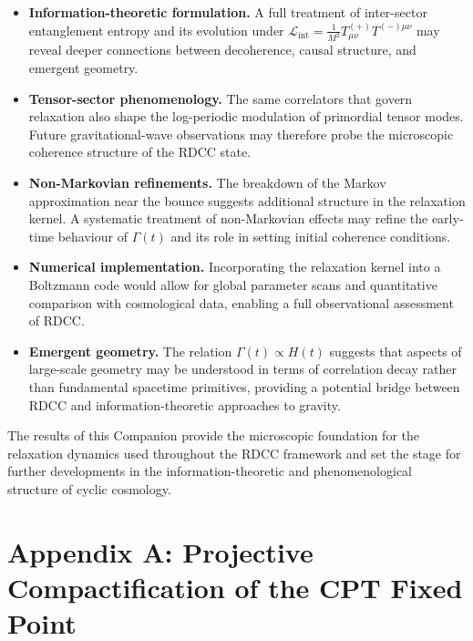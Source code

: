 \documentclass[11pt,a4paper]{article}
\newcommand{\LintDef}{\mathcal{L}_{\mathrm{int}} = \frac{1}{M^2} T^{(+)}_{\mu\nu} T^{(-)\mu\nu}}
\begin{document}
\begin{itemize}
    \item \textbf{Information-theoretic formulation.}
          A full treatment of inter-sector entanglement entropy and its
          evolution under \(\LintDef\) may reveal deeper connections between
          decoherence, causal structure, and emergent geometry.

    \item \textbf{Tensor-sector phenomenology.}
          The same correlators that govern relaxation also shape the
          log-periodic modulation of primordial tensor modes. Future
          gravitational-wave observations may therefore probe the microscopic
          coherence structure of the RDCC state.

    \item \textbf{Non-Markovian refinements.}
          The breakdown of the Markov approximation near the bounce suggests
          additional structure in the relaxation kernel. A systematic treatment
          of non-Markovian effects may refine the early-time behaviour of
          \(\Gamma(t)\) and its role in setting initial coherence conditions.

    \item \textbf{Numerical implementation.}
          Incorporating the relaxation kernel into a Boltzmann code would allow
          for global parameter scans and quantitative comparison with
          cosmological data, enabling a full observational assessment of RDCC.

    \item \textbf{Emergent geometry.}
          The relation \(\Gamma(t) \propto H(t)\) suggests that aspects of
          large-scale geometry may be understood in terms of correlation decay
          rather than fundamental spacetime primitives, providing a potential
          bridge between RDCC and information-theoretic approaches to gravity.
\end{itemize}

The results of this Companion provide the microscopic foundation for the
relaxation dynamics used throughout the RDCC framework and set the stage for
further developments in the information-theoretic and phenomenological
structure of cyclic cosmology.

\appendix
\section*{Appendix A: Projective Compactification of the CPT Fixed Point}
\end{document}
